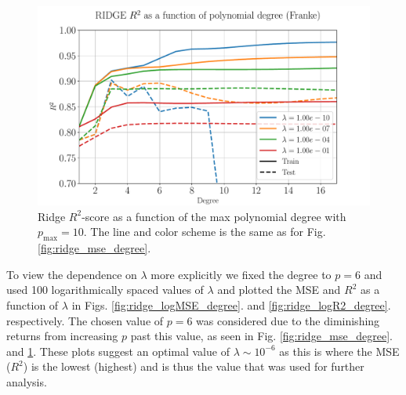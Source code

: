 \documentclass[%
reprint,
amsmath,amssymb,
aps,
pra,
]{revtex4-2}
\begin{document}
\begin{figure}[ht!]
	\centering
	\includegraphics[width=\linewidth]{Python/Figures/Ridge/RIDGE_R2_Unscaled.pdf}
	\caption{Ridge $R^2$-score as a function of the max polynomial degree with \(p_{\text{max}}=10\). The line and color scheme is the same as for Fig. \ref{fig:ridge_mse_degree}.}
	\label{fig:ridge_r2_degree}
\end{figure}

To view the dependence on $\lambda$ more explicitly we fixed the degree to \(p=6\) and used 100 logarithmically spaced values of $\lambda$ and plotted the MSE and $R^2$ as a function of $\lambda$ in Figs. \ref{fig:ridge_logMSE_degree}. and \ref{fig:ridge_logR2_degree}. respectively. The chosen value of $p=6$ was considered due to the diminishing returns from increasing \(p\) past this value, as seen in Fig. \ref{fig:ridge_mse_degree}. and \ref{fig:ridge_r2_degree}. These plots suggest an optimal value of $\lambda\sim 10^{-6}$ as this is where the MSE ($R^2$) is the lowest (highest) and is thus the value that was used for further analysis.
\end{document}
